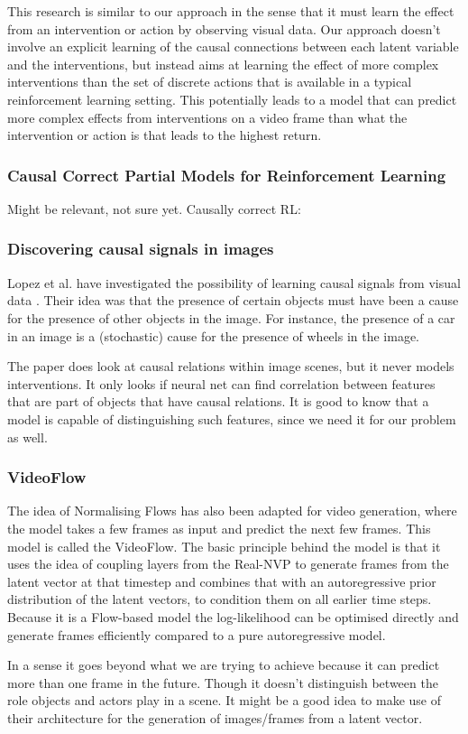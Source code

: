 \documentclass{article}
\begin{document}
This research is similar to our approach in the sense that it must learn the effect from an intervention or action by observing visual data. Our approach doesn't involve an explicit learning of the causal connections between each latent variable and the interventions, but instead aims at learning the effect of more complex interventions than the set of discrete actions that is available in a typical reinforcement learning setting. This potentially leads to a model that can predict more complex effects from interventions on a video frame than what the intervention or action is that leads to the highest return.



\subsubsection*{Causal Correct Partial Models for Reinforcement Learning}
Might be relevant, not sure yet.
Causally correct RL: \cite{rezende2020causally}

\subsubsection*{Discovering causal signals in images}
Lopez et al. have investigated the possibility of learning causal signals from visual data \cite{lopez2017discovering}. Their idea was that the presence of certain objects must have been a cause for the presence of other objects in the image. For instance, the presence of a car in an image is a (stochastic) cause for the presence of wheels in the image. 

The paper does look at causal relations within image scenes, but it never models interventions. It only looks if neural net can find correlation between features that are part of objects that have causal relations. It is good to know that a model is capable of distinguishing such features, since we need it for our problem as well.

\subsubsection*{VideoFlow}
The idea of Normalising Flows has also been adapted for video generation, where the model takes a few frames as input and predict the next few frames. This model is called the VideoFlow\cite{kumar2019videoflow}. The basic principle behind the model is that it uses the idea of coupling layers from the Real-NVP to generate frames from the latent vector at that timestep and combines that with an autoregressive prior distribution of the latent vectors, to condition them on all earlier time steps. Because it is a Flow-based model the log-likelihood can be optimised directly and generate frames efficiently compared to a pure autoregressive model.

In a sense it goes beyond what we are trying to achieve because it can predict more than one frame in the future. Though it doesn't distinguish between the role objects and actors play in a scene. It might be a good idea to make use of their architecture for the generation of images/frames from a latent vector.





\end{document}
